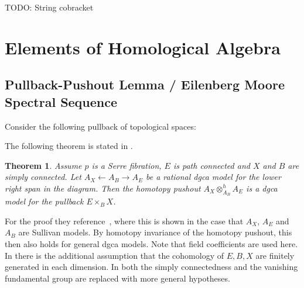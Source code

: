 \documentclass{scrartcl}
\theoremstyle{plain}
\newtheorem{theorem}{Theorem}[section]
\theoremstyle{definition}
\begin{document}
TODO: String cobracket


\section{Elements of Homological Algebra}

\subsection{Pullback-Pushout Lemma / Eilenberg Moore Spectral Sequence}\label{subsec:eilenberg_moore}
Consider the following pullback of topological spaces:
\begin{center}
\end{center}

The following theorem is stated in \cite{felix2012rational}.
\begin{theorem}
Assume $p$ is a Serre fibration, $E$ is path connected and $X$ and $B$ are simply connected. Let $A_X \leftarrow A_B \rightarrow A_E$ be a rational dgca model for the lower right span in the diagram. Then the homotopy pushout $A_X \otimes_{A_B}^h A_E$ is a dgca model for the pullback $E\times_B X$.
\end{theorem}
For the proof they reference~\cite[Proposition 15.8]{naef2022string}, where this is shown in the case that $A_X$, $A_E$ and $A_B$ are Sullivan models. By homotopy invariance of the homotopy pushout, this then also holds for general dgca models. Note that field coefficients are used here. In \cite{hatcher2004spectral} there is the additional assumption that the cohomology of $E, B, X$ are finitely generated in each dimension. In \cite{ramzi_eilenberg} both the simply connectedness and the vanishing fundamental group are replaced with more general hypotheses.


\end{document}
